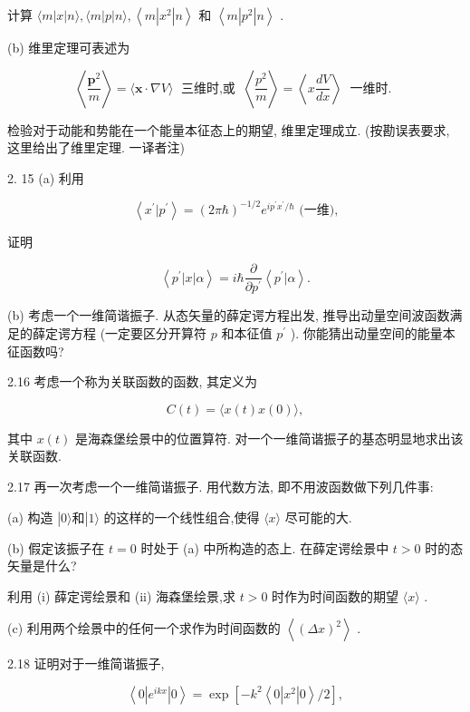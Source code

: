 \documentclass[lang=cn,newtx,10pt,scheme=chinese,thmcnt=section]{elegantbook}
\begin{document}
计算 $\langle m\left| x\right| n\rangle ,\langle m\left| p\right| n\rangle ,\left\langle {m\left| {x}^{2}\right| n}\right\rangle$ 和 $\left\langle {m\left| {p}^{2}\right| n}\right\rangle$ .

(b) 维里定理可表述为

$$
\left\langle \frac{{\mathbf{p}}^{2}}{m}\right\rangle = \langle \mathbf{x} \cdot \nabla V\rangle \;\text{ 三维时,或 }\;\left\langle \frac{{p}^{2}}{m}\right\rangle = \left\langle {x\frac{dV}{dx}}\right\rangle \;\text{ 一维时. }
$$

检验对于动能和势能在一个能量本征态上的期望, 维里定理成立. (按勘误表要求, 这里给出了维里定理. 一译者注)

2. 15 (a) 利用

$$
\left\langle {{x}^{\prime } | {p}^{\prime }}\right\rangle = {\left( 2\pi \hbar \right) }^{-1/2}{e}^{i{p}^{\prime }{x}^{\prime }/\hbar }\text{ (一维),}
$$

证明

$$
\left\langle {{p}^{\prime }\left| x\right| \alpha }\right\rangle = i\hbar \frac{\partial }{\partial {p}^{\prime }}\left\langle {{p}^{\prime } | \alpha }\right\rangle .
$$

(b) 考虑一个一维简谐振子. 从态矢量的薛定谔方程出发, 推导出动量空间波函数满足的薛定谔方程 (一定要区分开算符 $p$ 和本征值 ${p}^{\prime }$ ). 你能猜出动量空间的能量本征函数吗?

2.16 考虑一个称为关联函数的函数, 其定义为

$$
C\left( t\right) = \langle x\left( t\right) x\left( 0\right) \rangle ,
$$

其中 $x\left( t\right)$ 是海森堡绘景中的位置算符. 对一个一维简谐振子的基态明显地求出该关联函数.

2.17 再一次考虑一个一维简谐振子. 用代数方法, 即不用波函数做下列几件事:

(a) 构造 $\left| {0\rangle \text{和}}\right| 1\rangle$ 的这样的一个线性组合,使得 $\langle x\rangle$ 尽可能的大.

(b) 假定该振子在 $t = 0$ 时处于 (a) 中所构造的态上. 在薛定谔绘景中 $t > 0$ 时的态矢量是什么?

利用 (i) 薛定谔绘景和 (ii) 海森堡绘景,求 $t > 0$ 时作为时间函数的期望 $\langle x\rangle$ .

(c) 利用两个绘景中的任何一个求作为时间函数的 $\left\langle {\left( \Delta x\right) }^{2}\right\rangle$ .

2.18 证明对于一维简谐振子,

$$
\left\langle {0\left| {e}^{ikx}\right| 0}\right\rangle = \exp \left\lbrack {-{k}^{2}\left\langle {0\left| {x}^{2}\right| 0}\right\rangle /2}\right\rbrack ,
$$
\end{document}
